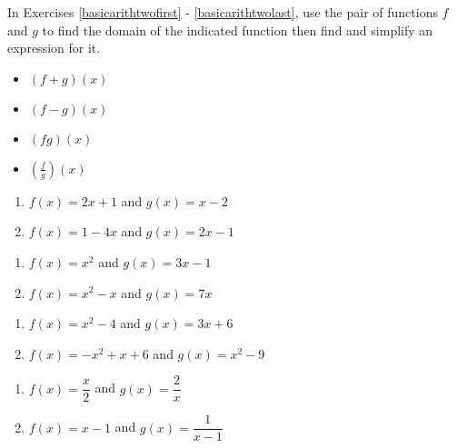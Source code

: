 In Exercises \ref{basicarithtwofirst} - \ref{basicarithtwolast}, use the pair of functions $f$ and $g$ to find the domain of the indicated function then find and simplify an expression for it.

\begin{multicols}{4}
\begin{itemize}

\item  $(f+g)(x)$
\item  $(f-g)(x)$
\item  $(fg)(x)$
\item  $\left(\frac{f}{g}\right)(x)$

\end{itemize}
\end{multicols}

\begin{multicols}{2}
\begin{enumerate}
\setcounter{enumi}{\value{HW}}

\item $f(x) = 2x+1$ and $g(x) = x-2$ \label{basicarithtwofirst}
\item $f(x) = 1-4x$ and $g(x) = 2x-1$

\setcounter{HW}{\value{enumi}}
\end{enumerate}
\end{multicols}

\begin{multicols}{2}
\begin{enumerate}
\setcounter{enumi}{\value{HW}}

\item $f(x) = x^2$ and $g(x) = 3x-1$
\item $f(x) = x^2-x$ and $g(x) = 7x$

\setcounter{HW}{\value{enumi}}
\end{enumerate}
\end{multicols}

\begin{multicols}{2}
\begin{enumerate}
\setcounter{enumi}{\value{HW}}

\item $f(x) = x^2-4$ and $g(x) = 3x+6$
\item $f(x) = -x^2+x+6$ and $g(x) = x^2-9$

\setcounter{HW}{\value{enumi}}
\end{enumerate}
\end{multicols}

\begin{multicols}{2}
\begin{enumerate}
\setcounter{enumi}{\value{HW}}

\item $f(x) = \dfrac{x}{2}$ and $g(x) = \dfrac{2}{x}$
\item $f(x) =x-1$ and $g(x) = \dfrac{1}{x-1}$

\setcounter{HW}{\value{enumi}}
\end{enumerate}
\end{multicols}

